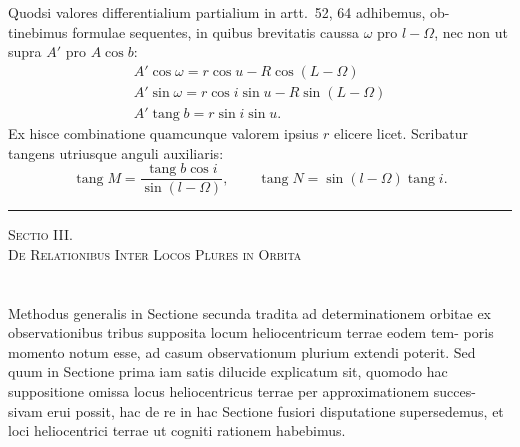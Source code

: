 \documentclass[12pt,a4paper]{article}
\newcommand{\tang}{\mathop{\mathrm{tang}}\nolimits}
\begin{document}
\section{}

Quodsi valores differentialium partialium in artt.~52, 64 adhibemus, ob-
tinebimus formulae sequentes, in quibus brevitatis caussa $\omega$ pro $l - \Omega$, nec non ut
supra $A'$ pro $A\cos b$:
\begin{gather*}
A'\cos\omega = r\cos u - R\cos(L - \Omega) \\
A'\sin\omega = r\cos i\sin u - R\sin(L - \Omega) \\
A'\tang b = r\sin i\sin u.
\end{gather*}
Ex hisce combinatione quamcunque valorem ipsius $r$ elicere licet. Scribatur
tangens utriusque anguli auxiliaris:
\[
\tang M = \frac{\tang b\cos i}{\sin(l - \Omega)}, \qquad \tang N = \sin(l - \Omega)\tang i.
\]


\begin{center}
\rule{0.5\textwidth}{0.4pt}
\end{center}

\vspace{1em}
\begin{center}
\Large\scshape Sectio III.\\[0.5em]
De Relationibus Inter Locos Plures in Orbita
\end{center}

\vspace{1em}

\section{}

Methodus generalis in Sectione secunda tradita ad determinationem orbitae
ex observationibus tribus supposita locum heliocentricum terrae eodem tem-
poris momento notum esse, ad casum observationum plurium extendi poterit.
Sed quum in Sectione prima iam satis dilucide explicatum sit, quomodo hac
suppositione omissa locus heliocentricus terrae per approximationem succes-
sivam erui possit, hac de re in hac Sectione fusiori disputatione supersedemus,
et loci heliocentrici terrae ut cogniti rationem habebimus.
\end{document}
